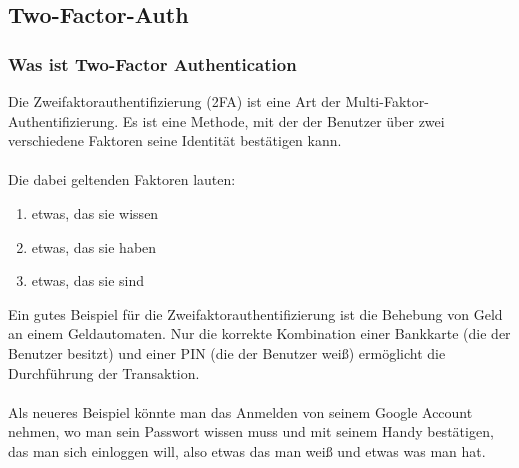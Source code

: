 \subsection{Two-Factor-Auth}
\label{sec:2fa}
\subsubsection{Was ist Two-Factor Authentication}
Die Zweifaktorauthentifizierung (2FA) ist eine Art der Multi-Faktor-Authentifizierung. Es ist eine Methode, mit der der Benutzer über zwei verschiedene Faktoren seine Identität bestätigen kann.\\ \\
Die dabei geltenden Faktoren lauten:
\begin{enumerate}
\item etwas, das sie wissen
\item etwas, das sie haben
\item etwas, das sie sind
\end{enumerate}
Ein gutes Beispiel für die Zweifaktorauthentifizierung ist die Behebung von Geld an einem Geldautomaten. Nur die korrekte Kombination einer Bankkarte (die der Benutzer besitzt) und einer PIN (die der Benutzer weiß) ermöglicht die Durchführung der Transaktion.\\ \\Als neueres Beispiel könnte man das Anmelden von seinem Google Account nehmen, wo man sein Passwort wissen muss und mit seinem Handy bestätigen, das man sich einloggen will, also etwas das man weiß und etwas was man hat. 

